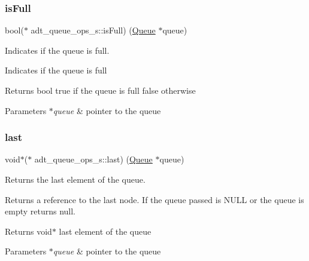 \subsubsection{\texorpdfstring{is\+Full}{isFull}}
{\footnotesize\ttfamily bool($\ast$ adt\+\_\+queue\+\_\+ops\+\_\+s\+::is\+Full) (\hyperlink{structadt__queue__s}{Queue} $\ast$queue)}



Indicates if the queue is full. 

Indicates if the queue is full

\begin{DoxyReturn}{Returns}
bool true if the queue is full false otherwise 
\end{DoxyReturn}

\begin{DoxyParams}{Parameters}
{\em $\ast$queue} & pointer to the queue \\
\hline
\end{DoxyParams}
\mbox{\label{structadt__queue__ops__s_acb93c165236a38fe0856dc8f514ad4c1}} 
\subsubsection{\texorpdfstring{last}{last}}
{\footnotesize\ttfamily void$\ast$($\ast$ adt\+\_\+queue\+\_\+ops\+\_\+s\+::last) (\hyperlink{structadt__queue__s}{Queue} $\ast$queue)}



Returns the last element of the queue. 

Returns a reference to the last node. If the queue passed is N\+U\+LL or the queue is empty returns null.

\begin{DoxyReturn}{Returns}
void$\ast$ last element of the queue 
\end{DoxyReturn}

\begin{DoxyParams}{Parameters}
{\em $\ast$queue} & pointer to the queue \\
\hline
\end{DoxyParams}
\mbox{\label{structadt__queue__ops__s_aae563dcc78fe992c354c9e1151dfcbbb}} 
